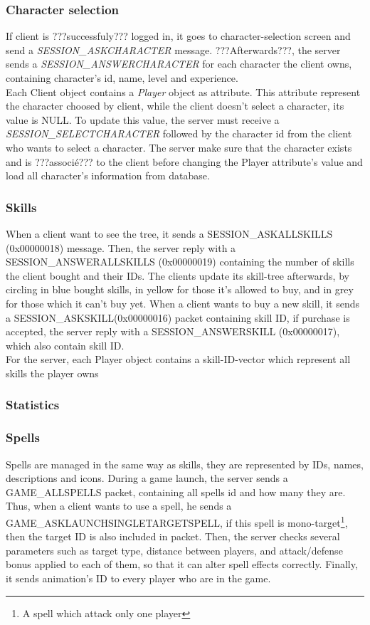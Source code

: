 \documentclass{scrreprt}
\begin{document}
				\subsubsection{Character selection}
				If client is ???successfuly??? logged in, it goes to character-selection screen and send a \emph{SESSION\_ASKCHARACTER} message. ???Afterwards???, the server sends a \emph{SESSION\_ANSWERCHARACTER} for each character the client owns, containing character's id, name, level and experience.\\
					Each Client object contains a \emph{Player} object as attribute. This attribute represent the character choosed by client, while the client doesn't select a character, its value is NULL. To update this value, the server must receive a \emph{SESSION\_SELECTCHARACTER} followed by the character id from the client who wants to select a character. The server make sure that the character exists and is ???associé??? to the client before changing the Player attribute's value and load all character's information from database.

					\subsubsection{Skills}
					When a client want to see the tree, it sends a SESSION\_ASKALLSKILLS (0x00000018) message. Then, the server reply with a SESSION\_ANSWERALLSKILLS (0x00000019) containing the number of skills the client bought and their IDs. The clients update its skill-tree afterwards, by circling in blue bought skills, in yellow for those it's allowed to buy, and in grey for those which it can't buy yet.
					When a client wants to buy a new skill, it sends a SESSION\_ASKSKILL(0x00000016) packet containing skill ID, if purchase is accepted, the server reply with a SESSION\_ANSWERSKILL (0x00000017), which also contain skill ID.\\

					For the server, each Player object contains a skill-ID-vector which represent all skills the player owns %

					\subsubsection{Statistics}

					\subsubsection{Spells}
					Spells are managed in the same way as skills, they are represented by IDs, names, descriptions and icons. During a game launch, the server sends a GAME\_ALLSPELLS packet, containing all spells id and how many they are. Thus, when a client wants to use a spell, he sends a GAME\_ASKLAUNCHSINGLETARGETSPELL, if this spell is mono-target\footnote{A spell which attack only one player}, then the target ID is also included in packet. Then, the server checks several parameters such as target type, distance between players, and attack/defense bonus applied to each of them, so that it can alter spell effects correctly. Finally, it sends animation's ID to every player who are in the game.
\end{document}

